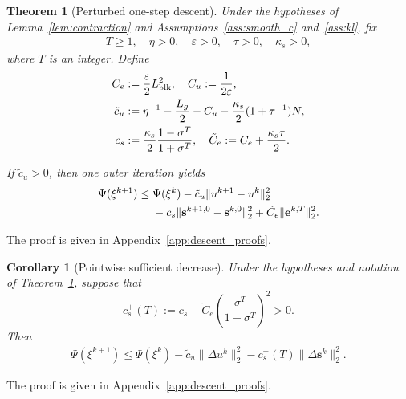 \documentclass[letterpaper, 10 pt, conference]{ieeeconf} %
\newtheorem{theorem}{Theorem}
\newtheorem{corollary}{Corollary}
\begin{document}
\begin{theorem}[Perturbed one-step descent]
\label{thm:suffdec_conf}
Under the hypotheses of Lemma~\ref{lem:contraction} and Assumptions~\ref{ass:smooth_c} and~\ref{ass:kl}, fix
\begin{align}
T\ge1,\quad
\eta>0,\quad
\varepsilon>0,\quad
\tau>0,\quad
\kappa_s>0,
\end{align}
where \(T\) is an integer. Define
\begin{align}
C_e&:=\frac{\varepsilon}{2}L_{\mathrm{blk}}^2,\quad
C_u:=\frac{1}{2\varepsilon},\notag\\
\tilde c_u
&:=\eta^{-1}-\frac{L_g}{2}-C_u
-\frac{\kappa_s}{2}(1+\tau^{-1})N,\notag\\
c_s
&:=\frac{\kappa_s}{2}
\frac{1-\sigma^T}{1+\sigma^T}, \quad
\tilde C_e :=C_e+\frac{\kappa_s\tau}{2}.
\end{align}

If \(\tilde c_u>0\), then one outer iteration yields
\begin{align}
\Psi(\xi^{k+1})
\le{}&
\Psi(\xi^k)
-\tilde c_u\|u^{k+1}-u^k\|_2^2 \notag\\
&-c_s\|\mathbf{s}^{k+1,0}-\mathbf{s}^{k,0}\|_2^2
+\tilde C_e\|\mathbf e^{k,T}\|_2^2 .
\end{align}
\end{theorem}
The proof is given in Appendix~\ref{app:descent_proofs}.

\begin{corollary}[Pointwise sufficient decrease]\label{cor:pointwise_descent}
Under the hypotheses and notation of Theorem~\ref{thm:suffdec_conf}, suppose that
\begin{equation}\label{eq:pointwise_absorb}
c_s^{+}(T)
:=
c_s
-
\tilde C_e\left(\frac{\sigma^T}{1-\sigma^T}\right)^2
>0 .
\end{equation}
Then
\begin{align}
\Psi(\xi^{k+1})
\le
\Psi(\xi^k)
-
\tilde c_u\|\Delta u^k\|_2^2
-
c_s^{+}(T)\|\Delta\mathbf s^k\|_2^2 .
\end{align}
\end{corollary}
The proof is given in Appendix~\ref{app:descent_proofs}.
\end{document}
